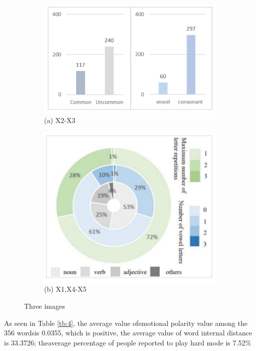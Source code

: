 \documentclass[12pt]{ctexart}
\begin{document}
\begin{figure}[!htbp]
	\centering
	\begin{subfigure}[t]{0.55\textwidth}
		\centering
		\includegraphics[width=\textwidth]{1706031763710.png}
		\caption*{(a) X2-X3}
		\label{a}
	\end{subfigure}
	\begin{subfigure}[t]{0.4\textwidth}
		\centering
		\includegraphics[width=\textwidth]{1706031798516(1).png}
		\caption*{(b) X1,X4-X5}
		\label{b}
	\end{subfigure}
	\caption{Three images}
	\label{Three images}
\end{figure}

As seen in Table \ref{tb:4}, the average value ofemotional polarity value among the 356 wordsis 0.0355, which is positive, the average value of word internal distance is 33.3726; theaverage percentage of people reported to play hard mode is 7.52\%
\end{document}
